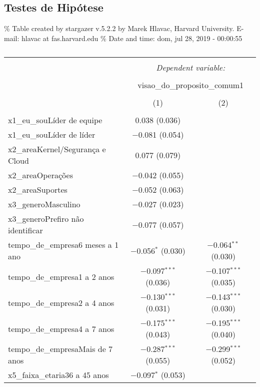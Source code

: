 \documentclass[]{book}
\begin{document}
\pagebreak

\hypertarget{testes-de-hipotese-9}{%
\subsection{Testes de Hipótese}\label{testes-de-hipotese-9}}

\% Table created by stargazer v.5.2.2 by Marek Hlavac, Harvard University. E-mail: hlavac at fas.harvard.edu
\% Date and time: dom, jul 28, 2019 - 00:00:55

\begin{table}[!htbp] \centering 
  \caption{} 
  \label{} 
\begin{tabular}{@{\extracolsep{5pt}}lcc} 
\\[-1.8ex]\hline 
\hline \\[-1.8ex] 
 & \multicolumn{2}{c}{\textit{Dependent variable:}} \\ 
\cline{2-3} 
\\[-1.8ex] & \multicolumn{2}{c}{visao\_do\_proposito\_comum1} \\ 
\\[-1.8ex] & (1) & (2)\\ 
\hline \\[-1.8ex] 
 x1\_eu\_souLíder de equipe & 0.038 (0.036) &  \\ 
  x1\_eu\_souLíder de líder & $-$0.081 (0.054) &  \\ 
  x2\_areaKernel/Segurança e Cloud & 0.077 (0.079) &  \\ 
  x2\_areaOperações & $-$0.042 (0.055) &  \\ 
  x2\_areaSuportes & $-$0.052 (0.063) &  \\ 
  x3\_generoMasculino & $-$0.027 (0.023) &  \\ 
  x3\_generoPrefiro não identificar & $-$0.077 (0.057) &  \\ 
  tempo\_de\_empresa6 meses a 1 ano & $-$0.056$^{*}$ (0.030) & $-$0.064$^{**}$ (0.030) \\ 
  tempo\_de\_empresa1 a 2 anos & $-$0.097$^{***}$ (0.036) & $-$0.107$^{***}$ (0.035) \\ 
  tempo\_de\_empresa2 a 4 anos & $-$0.130$^{***}$ (0.031) & $-$0.143$^{***}$ (0.030) \\ 
  tempo\_de\_empresa4 a 7 anos & $-$0.175$^{***}$ (0.043) & $-$0.195$^{***}$ (0.040) \\ 
  tempo\_de\_empresaMais de 7 anos & $-$0.287$^{***}$ (0.055) & $-$0.299$^{***}$ (0.052) \\ 
  x5\_faixa\_etaria36 a 45 anos & $-$0.097$^{*}$ (0.053) &  \\ 

\end{tabular}
\end{table}
\end{document}
